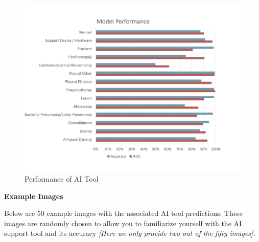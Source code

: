 \begin{figure}[H]
\caption{Performance of AI Tool}

\begin{center}
\includegraphics[scale=0.6]{images/ai_instruction_accuracy.pdf}
\end{center}
\end{figure}

\textbf{Example Images}

Below are 50 example images with the associated AI tool predictions.
These images are randomly chosen to allow you to familiarize yourself
with the AI support tool and its accuracy \emph{{[}Here we only provide
two out of the fifty images{]}.}


